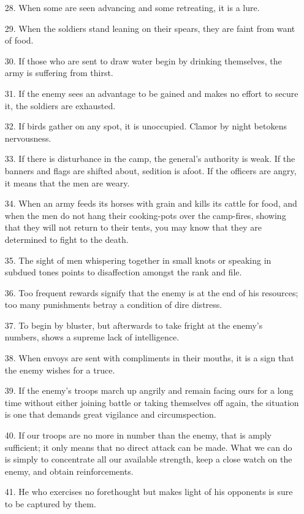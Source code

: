 \documentclass[11pt,openany]{memoir}
\newcommand{\enumeratemargin}{1.30em}
\begin{document}
\begin{enumerate}[leftmargin=\enumeratemargin]
\item[28.] When some are seen advancing and some retreating, it is a lure.
\item[29.] When the soldiers stand leaning on their spears, they are faint from want of food.
\item[30.] If those who are sent to draw water begin by drinking themselves, the army is suffering from thirst.
\item[31.] If the enemy sees an advantage to be gained and makes no effort to secure it, the soldiers are exhausted.
\item[32.] If birds gather on any spot, it is unoccupied. Clamor by night betokens nervousness.
\item[33.] If there is disturbance in the camp, the general's authority is weak. If the banners and flags are shifted about, sedition is afoot. If the officers are angry, it means that the men are weary.
\item[34.] When an army feeds its horses with grain and kills its cattle for food, and when the men do not hang their cooking-pots over the camp-fires, showing that they will not return to their tents, you may know that they are determined to fight to the death.
\item[35.] The sight of men whispering together in small knots or speaking in subdued tones points to disaffection amongst the rank and file.
\item[36.] Too frequent rewards signify that the enemy is at the end of his resources; too many punishments betray a condition of dire distress.
\item[37.] To begin by bluster, but afterwards to take fright at the enemy's numbers, shows a supreme lack of intelligence.
\item[38.] When envoys are sent with compliments in their mouths, it is a sign that the enemy wishes for a truce.
\item[39.] If the enemy's troops march up angrily and remain facing ours for a long time without either joining battle or taking themselves off again, the situation is one that demands great vigilance and circumspection.
\item[40.] If our troops are no more in number than the enemy, that is amply sufficient; it only means that no direct attack can be made. What we can do is simply to concentrate all our available strength, keep a close watch on the enemy, and obtain reinforcements.
\item[41.] He who exercises no forethought but makes light of his opponents is sure to be captured by them.

\end{enumerate}
\end{document}
